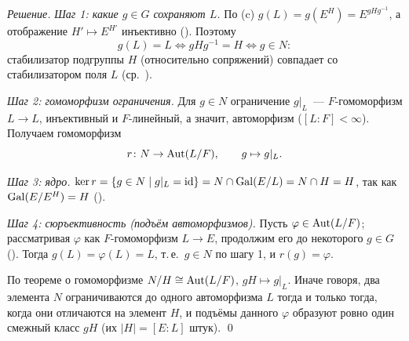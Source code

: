 \medskip\noindent\emph{Решение.} \emph{Шаг 1: какие $g\in G$ сохраняют $L$.} По (c) $g(L)=g(E^H)=E^{gHg^{-1}}$, а
отображение $H'\mapsto E^{H'}$ инъективно (). Поэтому
\[
g(L)=L\iff gHg^{-1}=H\iff g\in N :
\]
стабилизатор подгруппы $H$ (относительно сопряжений) совпадает со стабилизатором поля $L$ (ср.\ ).

\emph{Шаг 2: гомоморфизм ограничения.} Для $g\in N$ ограничение $g|_L$~--- $F$-гомоморфизм $L\to L$, инъективный и
$F$-линейный, а значит, автоморфизм ($[L:F]<\infty$). Получаем гомоморфизм
\[
r\colon N\to\operatorname{Aut}(L/F),\qquad g\mapsto g|_L .
\]

\emph{Шаг 3: ядро.} $\ker r=\{g\in N\mid g|_L=\operatorname{id}\}=N\cap\operatorname{Gal}(E/L)=N\cap H=H$, так как $\operatorname{Gal}(E/E^H)=H$ ().

\emph{Шаг 4: сюръективность (подъём автоморфизмов).} Пусть $\varphi\in\operatorname{Aut}(L/F)$; рассматривая $\varphi$ как
$F$-гомоморфизм $L\to E$, продолжим его до некоторого $g\in G$ (). Тогда $g(L)=\varphi(L)=L$, т.\,е.\ $g\in N$ по шагу 1, и $r(g)=\varphi$.

По теореме о гомоморфизме $N/H\cong\operatorname{Aut}(L/F)$, $gH\mapsto g|_L$. Иначе говоря, два элемента $N$ ограничиваются до одного
автоморфизма $L$ тогда и только тогда, когда они отличаются на элемент $H$, и подъёмы данного $\varphi$ образуют ровно
один смежный класс $gH$ (их $|H|=[E:L]$ штук). \qed

\begin{center}
\begin{keepfig}
\centering
{}
\end{keepfig}
\end{center}

